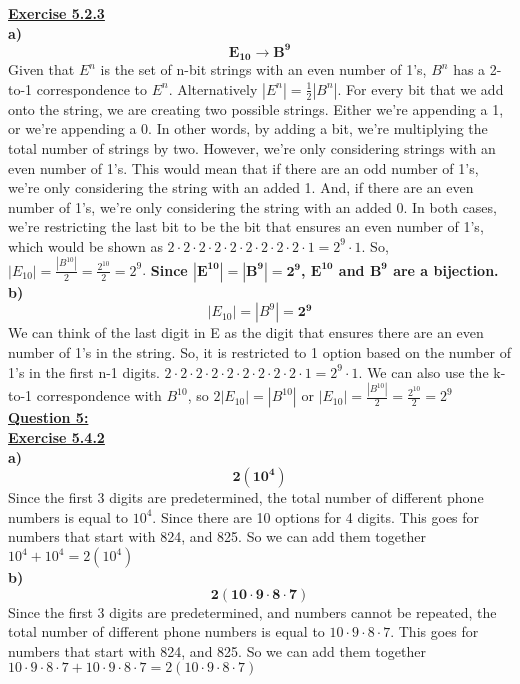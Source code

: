 \documentclass[12pt, letterpaper, twoside]{article}
\begin{document}
\newpage\noindent\textbf{\underline{Exercise 5.2.3}}\\
\textbf{a)}\\
\[\mathbf{E_{10} \to B^9}\]
\indent Given that $E^n$ is the set of n-bit strings with an even number of 1's, $B^n$ has a 2-to-1 correspondence to $E^n$. Alternatively $|E^n| = \frac{1}{2}|B^n|$. For every bit that we add onto the string, we are creating two possible strings. Either we're appending a 1, or we're appending a 0. In other words, by adding a bit, we're multiplying the total number of strings by two. However, we're only considering strings with an even number of 1's. This would mean that if there are an odd number of 1's, we're only considering the string with an added 1. And, if there are an even number of 1's, we're only considering the string with an added 0. In both cases, we're restricting the last bit to be the bit that ensures an even number of 1's, which would be shown as $2 \cdot 2 \cdot 2 \cdot 2 \cdot 2 \cdot 2 \cdot 2 \cdot 2 \cdot 2 \cdot 1 = 2^9 \cdot 1$. So, $|E_{10}| = \frac{|B^{10}|}{2} = \frac{2^{10}}{2} = 2^9$. \textbf{Since $\mathbf{|E^{10}| = |B^9| = 2^9}$, $\mathbf{E^{10}}$ and $\mathbf{B^9}$ are a bijection.}\\
\break
\textbf{b)}\[|E_{10}| = |B^9| = \mathbf{2^9}\]
\indent We can think of the last digit in E as the digit that ensures there are an even number of 1's in the string. So, it is restricted to 1 option based on the number of 1's in the first n-1 digits. $2 \cdot 2 \cdot 2 \cdot 2 \cdot 2 \cdot 2 \cdot 2 \cdot 2 \cdot 2 \cdot 1 = 2^9 \cdot 1$. We can also use the k-to-1 correspondence with $B^{10}$, so $2|E_{10}| = |B^{10}|$ or $|E_{10}| = \frac{|B^{10}|}{2} = \frac{2^{10}}{2} = 2^9$\\
\newpage\noindent \textbf{\underline{Question 5:}}\\
\break
\textbf{\underline{Exercise 5.4.2}}\\
\break
\textbf{a)} \\
\[\mathbf{2(10^4)}\]
\indent Since the first 3 digits are predetermined, the total number of different phone numbers is equal to $10^4$. Since there are 10 options for 4 digits. This goes for numbers that start with 824, and 825. So we can add them together $10^4 + 10^4 = 2(10^4)$\\
\break
\textbf{b)} \\
\[\mathbf{2(10 \cdot 9 \cdot 8 \cdot 7)}\]
\indent Since the first 3 digits are predetermined, and numbers cannot be repeated, the total number of different phone numbers is equal to $10 \cdot 9 \cdot 8 \cdot 7$. This goes for numbers that start with 824, and 825. So we can add them together $10 \cdot 9 \cdot 8 \cdot 7 + 10 \cdot 9 \cdot 8 \cdot 7= 2(10 \cdot 9 \cdot 8 \cdot 7)$\\
\end{document}
